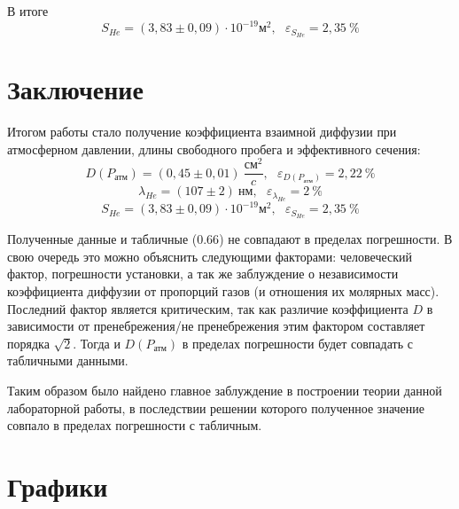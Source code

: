 \documentclass[a4paper,12pt]{article}
\begin{document}
В итоге
\begin{equation}
	S_{He} = (3,83 \pm 0,09) \cdot 10^{-19} \text{м}^2,\ ~ \  \varepsilon_{S_{He}} = 2,35\ \%
\end{equation}
\newpage

\section{Заключение}

Итогом работы стало получение коэффициента взаимной диффузии при атмосферном давлении, длины свободного пробега и эффективного сечения:
\[D(P_{\text{атм}}) = (0,45 \pm 0,01)\ \frac{\text{см}^2}{c}, \ ~ \ \varepsilon_{D(P_{\text{атм}})} = 2,22\ \% \]
\[\lambda_{He} = (107 \pm 2)\ \text{нм}, \ ~ \ \varepsilon_{\lambda_{He}} = 2\ \%\]
\[S_{He} = (3,83 \pm 0,09) \cdot 10^{-19} \text{м}^2,\ ~ \  \varepsilon_{S_{He}} = 2,35\ \% \]
 
 
Полученные данные и табличные ($0.66$) не совпадают в пределах погрешности. В свою очередь это можно объяснить следующими факторами: человеческий фактор, погрешности установки, а так же заблуждение о независимости коэффициента диффузии от пропорций газов (и отношения их молярных масс). Последний фактор является критическим, так как различие коэффициента $D$ в зависимости от пренебрежения/не пренебрежения этим фактором составляет порядка $\sqrt{2}$. Тогда и $D(P_{\text{атм}})$ в пределах погрешности будет совпадать с табличными данными.

Таким образом было найдено главное заблуждение в построении теории данной лабораторной работы, в последствии решении которого полученное значение совпало в пределах погрешности с табличным.

\section{Графики}

\begin{figure}[h]
\end{figure}
\end{document}
